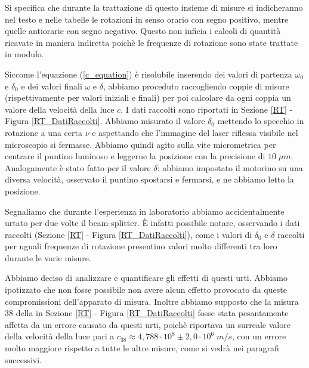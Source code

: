 \documentclass{article}
\begin{document}
\vspace{3mm}

Si specifica che durante la trattazione di questo insieme di misure si indicheranno nel testo e nelle tabelle le rotazioni in senso orario con segno positivo, mentre 
quelle antiorarie con segno negativo. Questo non inficia i calcoli di quantità ricavate in maniera indiretta poichè le frequenze di rotazione sono state trattate in
modulo.

\vspace{3mm}

Siccome l'equazione (\ref{c_equation}) è risolubile inserendo dei valori di partenza $\omega_0$ e $\delta_0$ e dei valori finali $\omega$ e $\delta$, abbiamo proceduto
raccogliendo coppie di misure (rispettivamente per valori iniziali e finali) per poi calcolare da ogni coppia un valore della velocità della luce $c$. I dati raccolti
sono riportati in Sezione \ref{RT} - Figura \ref{RT_DatiRaccolti}.
Abbiamo misurato il valore $\delta_0$ mettendo lo specchio in rotazione a una certa $\nu$ e aspettando che l'immagine del laser riflessa visibile nel microscopio
si fermasse. Abbiamo quindi agito sulla vite micrometrica per centrare il puntino luminoso e leggerne la posizione con la precisione di $10 \; \mu m$.
Analogamente è stato fatto per il valore $\delta$: abbiamo impostato il motorino su una diversa velocità, osservato il puntino spostarsi e fermarsi, e ne abbiamo letto la
posizione.

\vspace{3mm}

Segnaliamo che durante l'esperienza in laboratorio abbiamo accidentalmente urtato per due volte il beam-splitter. È infatti possibile notare, osservando i dati raccolti 
(Sezione \ref{RT} - Figura \ref{RT_DatiRaccolti}), come i valori di $\delta_0$ e $\delta$ raccolti per uguali frequenze di rotazione presentino valori molto differenti 
tra loro durante le varie misure.

\vspace{3mm}

Abbiamo deciso di analizzare e quantificare gli effetti di questi urti. Abbiamo ipotizzato che non fosse possibile non avere alcun effetto provocato da queste compromissioni
dell'apparato di misura. Inoltre abbiamo supposto che la misura 38 della in Sezione \ref{RT} - Figura \ref{RT_DatiRaccolti} fosse stata pesantamente affetta da un errore causato 
da questi urti, poichè riportava un surreale valore della velocità della luce pari a $c_{38}\approx 4,788 \cdot10^8 \pm 2,0 \cdot10^6 \; m/s$, con un errore molto maggiore 
rispetto a tutte le altre misure, come si vedrà nei paragrafi successivi. 
\end{document}
